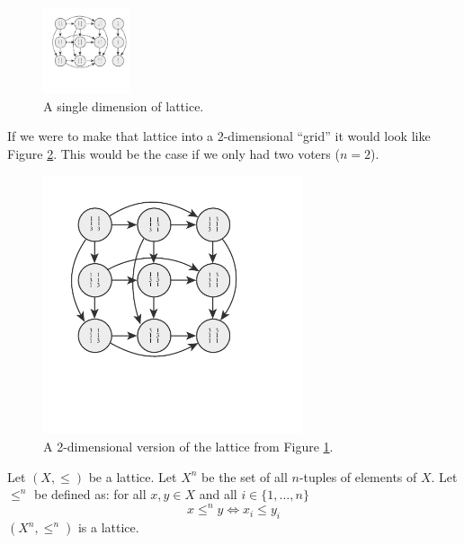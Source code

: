 	\begin{figure}[ht]
		\begin{center}
			\includegraphics[width=1in]{../figures/diagram5.pdf}
			\caption{A single dimension of lattice.}
			\label{figure-one-dimensional-lattice}
		\end{center}
	\end{figure}

	If we were to make that lattice into a 2-dimensional ``grid'' it would look like Figure \ref{figure-two-dimensional-lattice}. This would be the case if we only had two voters ($n = 2$).

	\begin{figure}[ht]
		\begin{center}
			\includegraphics[width=3in]{../figures/diagram6.pdf}
			\caption{A 2-dimensional version of the lattice from Figure \ref{figure-one-dimensional-lattice}.}
			\label{figure-two-dimensional-lattice}
		\end{center}
	\end{figure}

	\begin{proposition}
		\label{proposition-grid-is-lattice}
		Let $(X, \le)$ be a lattice. Let $X^n$ be the set of all $n$-tuples of elements of $X$. Let $\le^n$ be defined as: for all $x, y \in X$ and all $i \in \{1, \ldots, n\}$
		\[
			x \le^n y \iff x_i \le y_i
		\]
		$(X^n, \le^n)$ is a lattice.
	\end{proposition}


